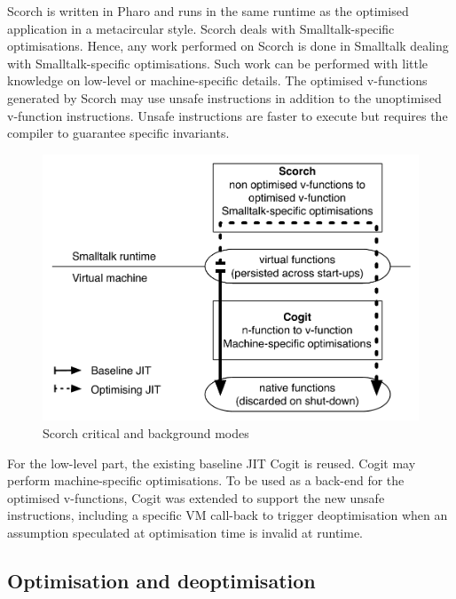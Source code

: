 \documentclass[a4paper,12pt,twoside]{../includes/ThesisStyle}
\begin{document}
Scorch is written in Pharo and runs in the same runtime as the optimised application in a metacircular style. Scorch deals with Smalltalk-specific optimisations. Hence, any work performed on Scorch is done in Smalltalk dealing with Smalltalk-specific optimisations. Such work can be performed with little knowledge on low-level or machine-specific details. The optimised v-functions generated by Scorch may use unsafe instructions in addition to the unoptimised v-function instructions. Unsafe instructions are faster to execute but requires the compiler to guarantee specific invariants.

\begin{figure}[h!]
    \begin{center}
        \includegraphics[width=0.8\linewidth]{OptArchitecture}
        \caption{Scorch critical and background modes}
        \label{fig:OptArchitecture}
    \end{center}
\end{figure}

For the low-level part, the existing baseline JIT Cogit is reused. Cogit may perform machine-specific optimisations. To be used as a back-end for the optimised v-functions, Cogit was extended to support the new unsafe instructions, including a specific VM call-back to trigger deoptimisation when an assumption speculated at optimisation time is invalid at runtime.

\subsection{Optimisation and deoptimisation}
\label{sec:further}
\end{document}
